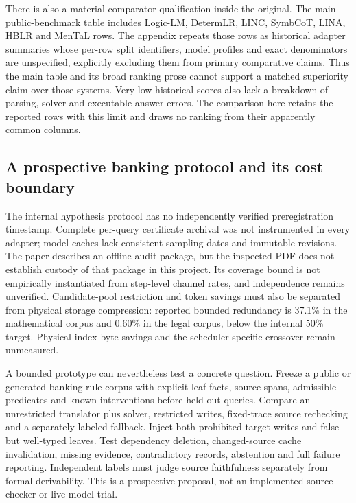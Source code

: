 There is also a material comparator qualification inside the original.
The main public-benchmark table includes Logic-LM, DetermLR, LINC, SymbCoT,
LINA, HBLR and MenTaL rows. The appendix repeats those rows as historical
adapter summaries whose per-row split identifiers, model profiles and exact
denominators are unspecified, explicitly excluding them from primary
comparative claims. Thus the main table and its broad ranking prose cannot
support a matched superiority claim over those systems. Very low historical
scores also lack a breakdown of parsing, solver and executable-answer errors.
The comparison here retains the reported rows with this limit and draws no
ranking from their apparently common columns.
\citep{exec23_controlled_writes_paper}

\subsection{A prospective banking protocol and its cost boundary}
\label{exec23:controlled-writes-decision}
The internal hypothesis protocol has no independently verified preregistration
timestamp. Complete per-query certificate archival was not instrumented in
every adapter; model caches lack consistent sampling dates and immutable
revisions. The paper describes an offline audit package, but the inspected
PDF does not establish custody of that package in this project. Its coverage
bound is not empirically instantiated from step-level channel rates, and
independence remains unverified. Candidate-pool restriction and token savings
must also be separated from physical storage compression: reported bounded
redundancy is 37.1\% in the mathematical corpus and 0.60\% in the legal
corpus, below the internal 50\% target. Physical index-byte savings and the
scheduler-specific crossover remain unmeasured.
\citep{exec23_controlled_writes_paper}

A bounded prototype can nevertheless test a concrete question. Freeze a
public or generated banking rule corpus with explicit leaf facts, source
spans, admissible predicates and known interventions before held-out queries.
Compare an unrestricted translator plus solver, restricted writes, fixed-trace
source rechecking and a separately labeled fallback. Inject both prohibited
target writes and false but well-typed leaves. Test dependency deletion,
changed-source cache invalidation, missing evidence, contradictory records,
abstention and full failure reporting. Independent labels must judge source
faithfulness separately from formal derivability. This is a prospective
proposal, not an implemented source checker or live-model trial.
\citep{exec23_controlled_writes_paper}

